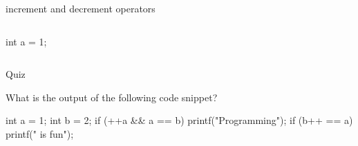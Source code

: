 \documentclass[compress]{beamer}
\begin{document}
\begin{slide}
	\begin{block}{increment and decrement operators}

	\begin{columns}

	\begin{terminal}
	int a = 1;
	\end{terminal}

	\begin{table}
	\end{table}
	\end{columns}

	\end{block}
\end{slide}

\begin{slide}
	\begin{block}{Quiz}

	What is the output of the following code snippet?

\begin{terminal}
int a = 1;
int b = 2;
if (++a && a == b)
    printf("Programming");
if (b++ == a)
    printf(" is fun");
\end{terminal}

	\end{block}
\end{slide}
\end{document}
